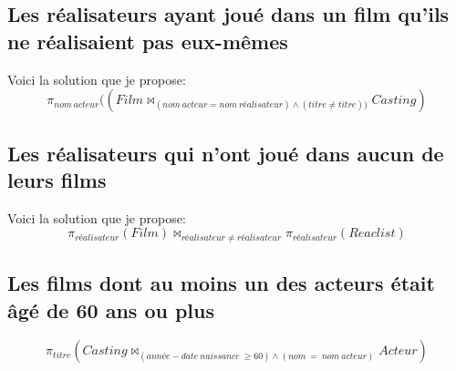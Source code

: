 \documentclass{article}
\begin{document}
\subsection{Les réalisateurs ayant joué dans un film qu'ils ne réalisaient pas eux-mêmes}
Voici la solution que je propose:
$$\pi_{nom \:acteur}((Film \bowtie_{(nom \:acteur = nom \:réalisateur) \wedge (titre \ne titre))} Casting)$$

\subsection{Les réalisateurs qui n'ont joué dans aucun de leurs films}
Voici la solution que je propose:
$$\pi_{réalisateur}(Film)\bowtie_{réalisateur \ne réalisateur} \pi_{réalisateur}(Reaclist)$$

\subsection{Les films dont au moins un des acteurs était âgé de 60 ans ou plus}
$$\pi_{titre}(Casting \bowtie_{(année - date \: naissance \: \geq 60) \wedge (nom \: = \:nom \: acteur) } Acteur)$$
\end{document}
